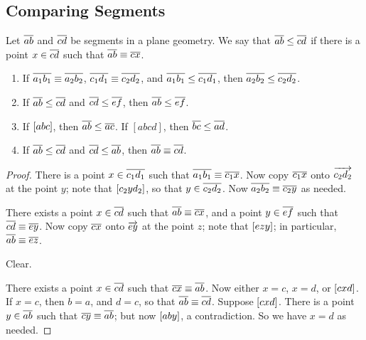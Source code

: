 \subsection*{Comparing Segments}

\begin{dfn}
Let \(\overline{ab}\) and \(\overline{cd}\) be segments in a plane geometry. We say that \(\overline{ab} \leq \overline{cd}\) if there is a point \(x \in \overline{cd}\) such that \(\overline{ab} \equiv \overline{cx}\).
\end{dfn}

\begin{prop} \mbox{}
\begin{enumerate}
\item If \(\overline{a_1b_1} \equiv \overline{a_2b_2}\), \(\overline{c_1d_1} \equiv \overline{c_2d_2}\), and \(\overline{a_1b_1} \leq \overline{c_1d_1}\), then \(\overline{a_2b_2} \leq \overline{c_2d_2}\).
\item If \(\overline{ab} \leq \overline{cd}\) and \(\overline{cd} \leq \overline{ef}\), then \(\overline{ab} \leq \overline{ef}\).
\item If \([ a b c ]\), then \(\overline{ab} \leq \overline{ac}\). If \([abcd]\), then \(\overline{bc} \leq \overline{ad}\).
\item If \(\overline{ab} \leq \overline{cd}\) and \(\overline{cd} \leq \overline{ab}\), then \(\overline{ab} \equiv \overline{cd}\).
\end{enumerate}
\end{prop}

\begin{proof}
\item There is a point \(x \in \overline{c_1d_1}\) such that \(\overline{a_1b_1} \equiv \overline{c_1x}\). Now copy \(\overline{c_1x}\) onto \(\overrightarrow{c_2d_2}\) at the point \(y\); note that \([ c_2 y d_2 ]\), so that \(y \in \overline{c_2d_2}\). Now \(\overline{a_2b_2} \equiv \overline{c_2y}\) as needed.

\item There exists a point \(x \in \overline{cd}\) such that \(\overline{ab} \equiv \overline{cx}\), and a point \(y \in \overline{ef}\) such that \(\overline{cd} \equiv \overline{ey}\). Now copy \(\overline{cx}\) onto \(\overrightarrow{ey}\) at the point \(z\); note that \([ e z y ]\); in particular, \(\overline{ab} \equiv \overline{ez}\).

\item Clear.

\item There exists a point \(x \in \overline{cd}\) such that \(\overline{cx} \equiv \overline{ab}\). Now either \(x = c\), \(x = d\), or \([ c x d ]\). If \(x = c\), then \(b = a\), and \(d = c\), so that \(\overline{ab} \equiv \overline{cd}\). Suppose \([ c x d ]\). There is a point \(y \in \overline{ab}\) such that \(\overline{cy} \equiv \overline{ab}\); but now \([ a b y ]\), a contradiction. So we have \(x = d\) as needed.
\end{proof}
